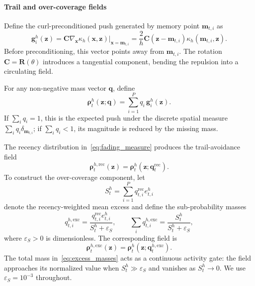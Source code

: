 \documentclass[conference]{IEEEtran}
\begin{document}
{\paragraph{Trail and over-coverage fields}
Define the curl-preconditioned push generated by memory point $\mathbf m_{t,i}$
as
\begin{equation}\label{eq:individual_memory_push}
\mathbf g_i^h(\mathbf z)
=
\mathbf C
\nabla_{\mathbf x}
\kappa_h(\mathbf x,\mathbf z)
\big|_{\mathbf x=\mathbf m_{t,i}}
=
\frac{2}{h}
\mathbf C(\mathbf z-\mathbf m_{t,i})
\kappa_h(\mathbf m_{t,i},\mathbf z).
\end{equation}
Before preconditioning, this vector points away from $\mathbf m_{t,i}$.
The rotation $\mathbf C=\mathbf R(\theta)$ introduces a tangential component,
bending the repulsion into a circulating field.

For any non-negative mass vector $\mathbf q$, define
\begin{equation}\label{eq:memory_repulsion}
\boldsymbol\rho_t^h(\mathbf z;\mathbf q)
=
\sum_{i=1}^{P}
q_i\,\mathbf g_i^h(\mathbf z).
\end{equation}
If $\sum_iq_i=1$, this is the expected push under the discrete spatial measure
$\sum_iq_i\delta_{\mathbf m_{t,i}}$; if $\sum_iq_i<1$, its magnitude is reduced
by the missing mass.

The recency distribution in~\eqref{eq:fading_measure} produces the
trail-avoidance field
\begin{equation}\label{eq:recency_field}
\boldsymbol\rho_t^{h,\mathrm{rec}}(\mathbf z)
=
\boldsymbol\rho_t^h(
\mathbf z;\mathbf q_t^{\mathrm{rec}}
).
\end{equation}
To construct the over-coverage component, let
\begin{equation}\label{eq:mean_excess}
S_t^h
=
\sum_{i=1}^{P}
q_{t,i}^{\mathrm{rec}}e_{t,i}^h
\end{equation}
denote the recency-weighted mean excess and define the sub-probability masses
\begin{equation}\label{eq:excess_masses}
q_{t,i}^{h,\mathrm{exc}}
=
\frac{
q_{t,i}^{\mathrm{rec}}e_{t,i}^h
}{
S_t^h+\varepsilon_S
},
\qquad
\sum_iq_{t,i}^{h,\mathrm{exc}}
=
\frac{S_t^h}{S_t^h+\varepsilon_S},
\end{equation}
where $\varepsilon_S>0$ is dimensionless. The corresponding field is
\begin{equation}\label{eq:excess_field}
\boldsymbol\rho_t^{h,\mathrm{exc}}(\mathbf z)
=
\boldsymbol\rho_t^h(
\mathbf z;\mathbf q_t^{h,\mathrm{exc}}
).
\end{equation}
The total mass in~\eqref{eq:excess_masses} acts as a continuous activity gate:
the field approaches its normalized value when
$S_t^h\gg\varepsilon_S$ and vanishes as $S_t^h\to0$. We use
$\varepsilon_S=10^{-3}$ throughout.

}
\end{document}
